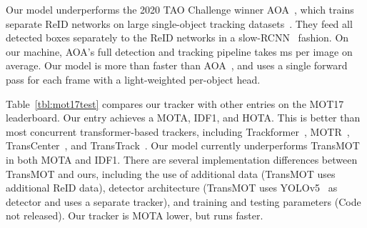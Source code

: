\documentclass[10pt,twocolumn,letterpaper]{article}
\newcommand{\reftbl}[1]{Table~\ref{tbl:#1}}
\begin{document}
Our model underperforms the 2020 TAO Challenge winner AOA~\cite{Du_2020_TAO},
which trains separate ReID networks on large single-object tracking datasets~\cite{real2017youtube,huang2019got,russakovsky2015imagenet}.
They feed all detected boxes separately to the ReID networks in a slow-RCNN~\cite{girshick2014rich} fashion.
On our machine, AOA's full detection and tracking pipeline takes ms per image on average.
Our model is more than  faster than AOA~\cite{Du_2020_TAO}, and uses a single forward pass for each frame with a light-weighted per-object head.

\reftbl{mot17test} compares our tracker with other entries on the MOT17 leaderboard.
Our entry achieves a  MOTA,  IDF1, and  HOTA.
This is better than most concurrent transformer-based trackers, including Trackformer~\cite{meinhardt2021trackformer}, MOTR~\cite{zeng2021motr}, TransCenter~\cite{xu2021transcenter}, and TransTrack~\cite{transtrack}.
Our model currently underperforms TransMOT~\cite{chu2021transmot} in both MOTA and IDF1.
There are several implementation differences between TransMOT and ours, including the use of additional data (TransMOT uses additional ReID data), detector architecture (TransMOT uses YOLOv5~\cite{yolov5} as detector and uses a separate tracker), and training and testing parameters (Code not released).
Our tracker is  MOTA lower, but runs  faster. 
\end{document}
